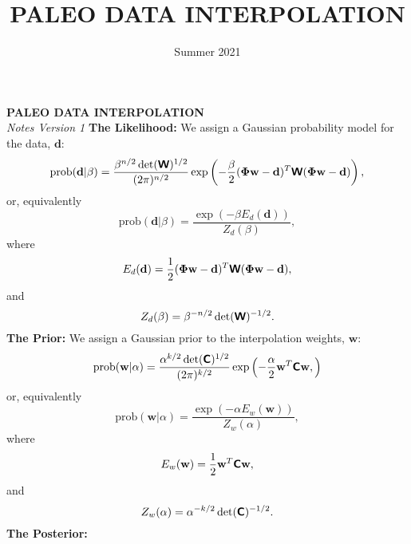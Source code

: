 \documentclass[11pt]{article}
\newcommand{\p}{\mbox{prob}}
\newcommand{\w}{\mathbf{w}}
\newcommand{\dat}{\mathbf{d}}
\def\bPhi{\boldsymbol{\Phi}}
\def\C{\boldsymbol{\sf C}}
\def\W{\boldsymbol{\sf W}}
\def\p{\mbox{prob}}
\begin{document}
\thispagestyle{empty}
\title{PALEO DATA INTERPOLATION
\newline
}
\date{Summer 2021}
\noindent
{\bf PALEO DATA INTERPOLATION}\\{\em Notes Version 1}
\newline
\newline
\noindent
{\bf The Likelihood:}
\newline
\noindent
We assign a Gaussian probability model for the data, $\dat$:
\begin{equation}
  \p(\dat|\beta) = \frac{\beta^{n/2}\det(\W)^{1/2}}{(2\pi)^{n/2}} \exp
  \left(
    -\frac{\beta}{2} (\bPhi\w - \dat)^T \W (\bPhi\w - \dat)
  \right),
\end{equation}
or, equivalently
\begin{equation}
  \p(\dat|\beta) = \frac{\exp\left(-\beta E_d(\dat)\right)}{Z_d(\beta)},
\end{equation}
where
\begin{equation}
  E_d(\dat) = \frac{1}{2} (\bPhi\w - \dat)^T \W (\bPhi \w -\dat),
\end{equation}
and
\begin{equation}
  Z_d(\beta) = \beta^{-n/2} \det(\W)^{-1/2}.
\end{equation}
\newline
\newline
\noindent
{\bf The Prior:}
\newline
\noindent
We assign a Gaussian prior to the interpolation weights, $\w$:
\begin{equation}
  \p(\w|\alpha) = \frac{\alpha^{k/2}\det(\C)^{1/2}}{(2\pi)^{k/2}} \exp
  \left(
    -\frac{\alpha}{2} \w^T \C \w,
  \right)
\end{equation}
or, equivalently
\begin{equation}
  \p(\w |\alpha ) = \frac{ \exp \left(-\alpha E_w(\w) \right) }{Z_w(\alpha)},
\end{equation}
where
\begin{equation}
  E_w(\w ) = \frac{1}{2}\w^T\C\w,
\end{equation}
and
\begin{equation}
  Z_w(\alpha) = \alpha^{-k/2}\det(\C)^{-1/2}.
\end{equation}
\newline
\newline
\noindent
{\bf The Posterior:}
\newline
\end{document}

